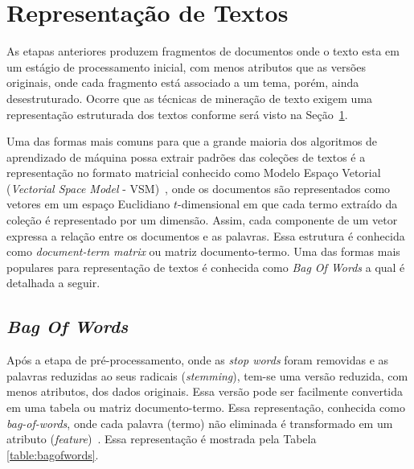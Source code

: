 
\section{Representação de Textos} \label{subsection:RepTextos}

As etapas anteriores produzem fragmentos de documentos onde o texto esta em um estágio de processamento inicial, com menos atributos que as versões originais, onde cada fragmento está associado a um tema, porém, ainda desestruturado. Ocorre que as técnicas de mineração de texto exigem uma representação estruturada dos textos conforme será visto na Seção~\ref{subsection:RepTextos}.

Uma das formas mais comuns para que a grande maioria dos algoritmos de aprendizado de máquina possa extrair padrões das coleções de textos é a representação no formato matricial conhecido como Modelo Espaço Vetorial (\textit{Vectorial Space Model} - VSM)~\cite{Rezende2003}, onde os documentos são representados como vetores em um espaço Euclidiano $t$-dimensional em que cada termo extraído da coleção é representado por um dimensão. Assim, cada componente de um vetor expressa a relação entre os documentos e as palavras. Essa estrutura é conhecida como \textit{document-term matrix} ou matriz documento-termo. Uma das formas mais populares para representação de textos é conhecida como \textit{Bag Of Words} a qual é detalhada a seguir.
	


\subsection{\textit{Bag Of Words}} \label{subsubsec:BOW}
Após a etapa de pré-processamento, onde as \textit{stop words} foram removidas e as palavras reduzidas ao seus radicais (\textit{stemming}), tem-se uma versão reduzida, com menos atributos, dos dados originais. Essa versão pode ser facilmente convertida em uma tabela ou matriz documento-termo. Essa representação, conhecida como \textit{bag-of-words}, onde cada palavra (termo) não eliminada é transformado em um atributo (\textit{feature})~\cite{Rezende2003}.	Essa representação é mostrada pela Tabela \ref{table:bagofwords}.
		

